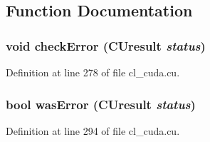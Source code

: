 \subsection{Function Documentation}
\hypertarget{cl__cuda_8cu_a6367bddb9bffa83d7bcf228def049b49}{
\subsubsection[{checkError}]{\setlength{\rightskip}{0pt plus 5cm}void checkError (CUresult {\em status})}}
\label{cl__cuda_8cu_a6367bddb9bffa83d7bcf228def049b49}


Definition at line 278 of file cl\_\-cuda.cu.\hypertarget{cl__cuda_8cu_a122aefe5eab9c7fdf0d6710df7eefae5}{
\subsubsection[{wasError}]{\setlength{\rightskip}{0pt plus 5cm}bool wasError (CUresult {\em status})}}
\label{cl__cuda_8cu_a122aefe5eab9c7fdf0d6710df7eefae5}


Definition at line 294 of file cl\_\-cuda.cu.